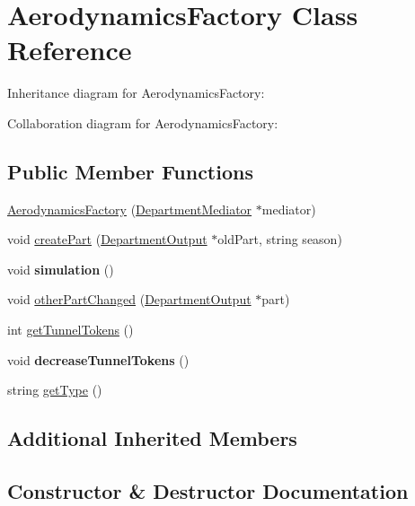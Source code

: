\hypertarget{classAerodynamicsFactory}{}\section{Aerodynamics\+Factory Class Reference}
\label{classAerodynamicsFactory}


Inheritance diagram for Aerodynamics\+Factory\+:


Collaboration diagram for Aerodynamics\+Factory\+:
\subsection*{Public Member Functions}
\begin{DoxyCompactItemize}
\item 
\hyperlink{classAerodynamicsFactory_a46f12bf52bad9b98d19f6dcd3a04c384}{Aerodynamics\+Factory} (\hyperlink{classDepartmentMediator}{Department\+Mediator} $\ast$mediator)
\item 
void \hyperlink{classAerodynamicsFactory_a2c6e6ce04d21da014e3c0c6affe423ae}{create\+Part} (\hyperlink{classDepartmentOutput}{Department\+Output} $\ast$old\+Part, string season)
\item 
\mbox{\label{classAerodynamicsFactory_ab8da5b4d88a649174376d08d17503d30}} 
void {\bfseries simulation} ()
\item 
void \hyperlink{classAerodynamicsFactory_a873e60729f4e8a74608fbf29322cf2f6}{other\+Part\+Changed} (\hyperlink{classDepartmentOutput}{Department\+Output} $\ast$part)
\item 
int \hyperlink{classAerodynamicsFactory_a687a3fcb4eeabf97d8c024cfb63406e5}{get\+Tunnel\+Tokens} ()
\item 
\mbox{\label{classAerodynamicsFactory_a244210a6b33080c3426d486d09187717}} 
void {\bfseries decrease\+Tunnel\+Tokens} ()
\item 
string \hyperlink{classAerodynamicsFactory_a3b0af6c00d4a8549164b3d5ec9a1f256}{get\+Type} ()
\end{DoxyCompactItemize}
\subsection*{Additional Inherited Members}


\subsection{Constructor \& Destructor Documentation}
\mbox{\label{classAerodynamicsFactory_a46f12bf52bad9b98d19f6dcd3a04c384}} 
